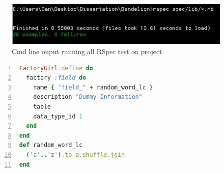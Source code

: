 \documentclass[a4paper,12pt]{article}
\begin{document}
\begin{figure}
\includegraphics[width=\linewidth]{screenshots/mytestresult}
\caption{Cmd line ouput running all RSpec test on project}
\label{fig:mytestresult}
\end{figure}
\begin{lstlisting}[frame=single,numbers=left,language = ruby,caption= {Factory for field}, label={code:fgirl}]
FactoryGirl.define do
  factory :field do
    name { "field_" + random_word_lc }
    description "Dummy Information"
    table
    data_type_id 1
  end
end
def random_word_lc
  ('a'..'z').to_a.shuffle.join
end
\end{lstlisting}
\end{document}
